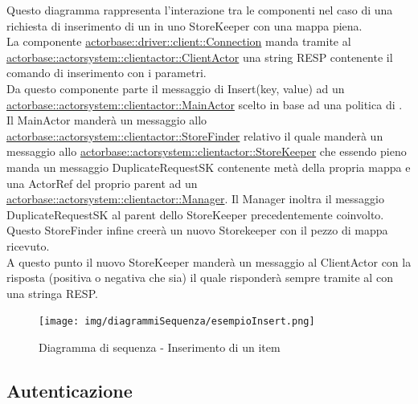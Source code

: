 \documentclass{scalatekids-article}
\begin{document}
Questo diagramma rappresenta l'interazione tra le componenti nel caso di una richiesta di inserimento di un  in uno StoreKeeper con una mappa piena.\\
La componente \hyperref[sec:actorbase::driver::client::Connection]{actorbase::driver::client::Connection} 
manda tramite  al \hyperref[sec:actorbase::actorsystem::clientactor::ClientActor]{actorbase::actorsystem::clientactor::ClientActor} 
una string RESP contenente il comando di inserimento  con 
i parametri.\\ %
Da questo componente parte il messaggio di Insert(key, value) ad un \hyperref[sec:actorbase::actorsystem::clientactor::MainActor]{actorbase::actorsystem::clientactor::MainActor} scelto in base ad una 
politica di . Il MainActor manderà un messaggio allo \hyperref[sec:actorbase::actorsystem::clientactor::StoreFinder]{actorbase::actorsystem::clientactor::StoreFinder} relativo il quale manderà un messaggio allo \hyperref[sec:actorbase::actorsystem::clientactor::StoreKeeper]{actorbase::actorsystem::clientactor::StoreKeeper} che essendo pieno manda un 
messaggio DuplicateRequestSK contenente metà della propria mappa e una ActorRef del proprio parent ad un \hyperref[sec:actorbase::actorsystem::clientactor::Manager]{actorbase::actorsystem::clientactor::Manager}. Il Manager inoltra il messaggio DuplicateRequestSK al parent dello StoreKeeper precedentemente coinvolto. Questo StoreFinder infine creerà un nuovo Storekeeper con il pezzo di mappa ricevuto. \\
A questo punto il nuovo StoreKeeper manderà un messaggio al ClientActor con 
la risposta (positiva o negativa che sia) il quale risponderà sempre tramite 
 al  con una stringa RESP.
\begin{figure}[H]
  \begin{center}
    \texttt{[image: img/diagrammiSequenza/esempioInsert.png]}
    \caption{Diagramma di sequenza - Inserimento di un item}
  \end{center}
\end{figure}

\subsection{Autenticazione}
\end{document}
